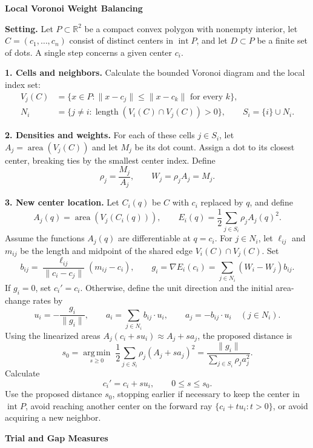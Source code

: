 \documentclass[11pt]{article}
\newcommand{\area}{\operatorname{area}}
\newcommand{\length}{\operatorname{length}}
\newcommand{\interior}{\operatorname{int}}
\begin{document}
\begin{center}
  {\Large\bfseries Local Voronoi Weight Balancing}
\end{center}
\vspace{-5pt}

\textbf{Setting.}
Let $P\subset\mathbb R^2$ be a compact convex polygon with nonempty
interior, let $C=(c_1,\ldots,c_n)$ consist of distinct centers in
$\interior P$, and let $D\subset P$ be a finite set of dots.
A single step concerns a given center $c_i$.

\medskip
\textbf{1. Cells and neighbors.}
Calculate the bounded Voronoi diagram and the local index set:
\begin{align*}
V_j(C)&=\{x\in P:\|x-c_j\|\leq\|x-c_k\|\text{ for every }k\},
\\
N_i&=\{j\ne i:\length(V_i(C)\cap V_j(C))>0\},
\qquad S_i=\{i\}\cup N_i.
\end{align*}

\textbf{2. Densities and weights.}
For each of these cells $j\in S_i$, let $A_j=\area(V_j(C))$ and let
$M_j$ be its dot count. Assign a dot to its closest center, breaking
ties by the smallest center index. Define
\[
\rho_j=\frac{M_j}{A_j},\qquad W_j=\rho_j A_j=M_j.
\]

\textbf{3. New center location.}
Let $C_i(q)$ be $C$ with $c_i$ replaced by $q$, and define
\[
A_j(q)=\area(V_j(C_i(q))),\qquad
E_i(q)=\frac12\sum_{j\in S_i}\rho_j A_j(q)^2.
\]
Assume the functions $A_j(q)$ are differentiable at $q=c_i$.
For $j\in N_i$, let $\ell_{ij}$ and $m_{ij}$ be the length and
midpoint of the shared edge $V_i(C)\cap V_j(C)$. Set
\[
b_{ij}=\frac{\ell_{ij}}{\|c_i-c_j\|}(m_{ij}-c_i),\qquad
g_i=\nabla E_i(c_i)=\sum_{j\in N_i}(W_i-W_j)b_{ij}.
\]
If $g_i=0$, set $c_i'=c_i$. Otherwise, define the unit direction
and the initial area-change rates by
\[
u_i=-\frac{g_i}{\|g_i\|},\qquad
a_i=\sum_{j\in N_i}b_{ij}\cdot u_i,\qquad
a_j=-b_{ij}\cdot u_i\quad(j\in N_i).
\]
Using the linearized areas $A_j(c_i+s u_i)\approx A_j+s a_j$,
the proposed distance is
\[
\boxed{\displaystyle
s_0=\underset{s\geq0}{\operatorname{arg\,min}}\;
\frac12\sum_{j\in S_i}\rho_j(A_j+s a_j)^2
=\frac{\|g_i\|}{\displaystyle\sum_{j\in S_i}\rho_j a_j^2}.}
\]
Calculate
\[
\boxed{c_i'=c_i+s u_i,\qquad 0\leq s\leq s_0.}
\]
Use the proposed distance $s_0$, stopping earlier if necessary to
keep the center in $\interior P$, avoid reaching another center on
the forward ray $\{c_i+t u_i:t>0\}$, or avoid acquiring a new neighbor.

\newpage
\begin{center}
  {\Large\bfseries Trial and Gap Measures}
\end{center}
\vspace{-5pt}
\end{document}
